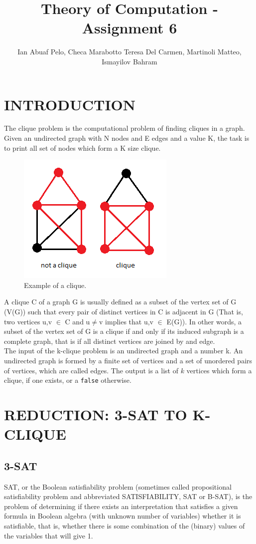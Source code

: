 \documentclass[table]{article}
\title{Theory of Computation - Assignment 6}
\author{Ian Abuaf Pelo, Checa Marabotto Teresa Del Carmen, Martinoli Matteo, Ismayilov Bahram}
\begin{document}
\maketitle
\section{INTRODUCTION}
The clique problem is the computational problem of finding cliques in a graph. Given an undirected graph with N nodes and E edges and a value K, the task is to print all set of nodes which form a K size clique. 

\begin{figure}[h]
    \centering
    \includegraphics[scale=0.7]{MrlSG.png}
    \caption{Example of a clique.}\label{f1}
\end{figure}

A clique C of a graph G is usually defined as a subset of the vertex set of G (V(G)) such that every pair of distinct vertices in C is adjacent in G (That is, two vertices u,v $\in$ C and u$\neq$v implies that u,v $\in$ E(G)). In other words, a subset of the vertex set of G is a clique if and only if its induced subgraph is a complete graph, that is if all distinct vertices are joined by and edge.
\\
The input of the k-clique problem is an undirected graph and a number k. 
An undirected graph is formed by a finite set of vertices and a set of unordered pairs of vertices, which are called edges. 
The output is a list of $k$ vertices which form a clique, if one exists, or a \lstinline{false} otherwise.

\section{REDUCTION: 3-SAT TO K-CLIQUE}
\subsection{3-SAT}
SAT, or the Boolean satisfiability problem (sometimes called propositional satisfiability problem and abbreviated SATISFIABILITY, SAT or B-SAT), is the problem of determining if there exists an interpretation that satisfies a given formula in Boolean algebra (with unknown number of variables) whether it is satisfiable, that is, whether there is some combination of the (binary) values of the variables that will give 1.
\end{document}
